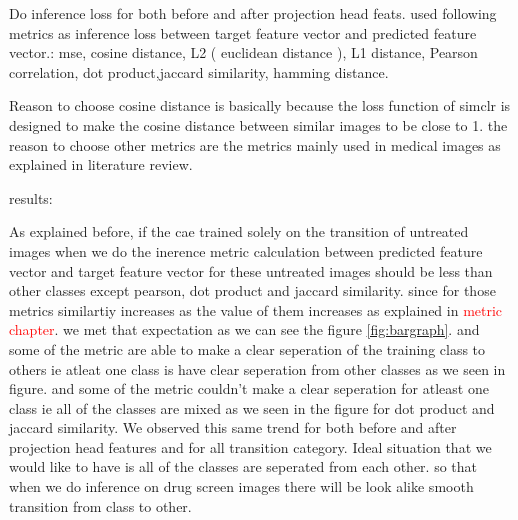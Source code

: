 Do inference loss for both  before and after projection head feats.
used following metrics as inference loss between target feature vector and predicted feature vector.: mse, cosine distance, L2 ( euclidean distance ), L1 distance, Pearson correlation, dot product,jaccard similarity, hamming distance.

Reason to choose cosine distance is basically because the loss function of simclr is designed to make the cosine distance between similar images to be close to 1. the reason to choose other metrics are the metrics mainly used in medical images as explained in literature review.


results:

As explained before, if the cae trained solely on the transition of untreated images when we do the inerence metric calculation between predicted feature vector and target feature vector for these untreated images should be less than other classes  except pearson, dot product and jaccard similarity. since for those metrics similartiy increases as the value of them increases as explained in \textcolor{red}{ metric chapter}. we met that expectation as we can see the figure \ref{fig:bargraph}.  and some of the metric are able to make a clear seperation of the training class to others ie atleat one class is have clear seperation from other classes as we seen in figure. and some of the metric couldn't make a clear seperation for atleast one class ie all of the classes are mixed as we seen in the figure for dot product and jaccard similarity. We observed this same trend  for both before and after projection head features and for all transition category. Ideal situation that we would like to have is all of the classes are seperated from each other. so that when we do inference on drug screen images there will be look alike smooth transition from class to other.

